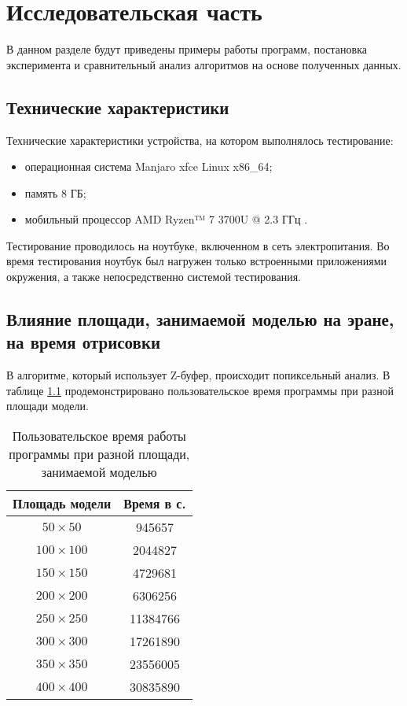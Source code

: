 \chapter{Исследовательская часть}

В данном разделе будут приведены примеры работы программ, постановка эксперимента и сравнительный анализ алгоритмов на основе полученных данных.

\section{Технические характеристики}

Технические характеристики устройства, на котором выполнялось тестирование:

\begin{itemize}
	\item операционная система Manjaro xfce \cite{ubuntu} Linux \cite{linux} x86\_64;
	\item память 8 ГБ;
	\item мобильный процессор AMD Ryzen™ 7 3700U @ 2.3 ГГц \cite{intel}.
\end{itemize}

Тестирование проводилось на ноутбуке, включенном в сеть электропитания. Во время тестирования ноутбук был нагружен только встроенными приложениями окружения, а также непосредственно системой тестирования.

\section{Влияние площади, занимаемой моделью на эране, на время отрисовки}

В алгоритме, который использует Z-буфер, происходит попиксельный анализ. В таблице \ref{tab:time1} продемонстрировано пользовательское время программы при разной площади модели.

\begin{table}[ht!]
	\begin{center}
		\caption{Пользовательское время работы программы при разной площади, занимаемой моделью}
		\label{tab:time1}
		\begin{tabular}{|c|c|}
			\hline
			Площадь модели & Время в с. \\
			\hline
			$50 \times 50$  &  945657 \\
			\hline
			$100 \times 100$  & 2044827 \\
			\hline
			$150 \times 150$  & 4729681 \\
			\hline
			$200 \times 200$ & 6306256 \\
			\hline
			$250 \times 250$ & 11384766 \\
			\hline
			$300 \times 300$ & 17261890 \\
			\hline
			$350 \times 350$ & 23556005 \\
			\hline
			$400 \times 400$ & 30835890 \\
			\hline
		\end{tabular}
	\end{center}
\end{table}

